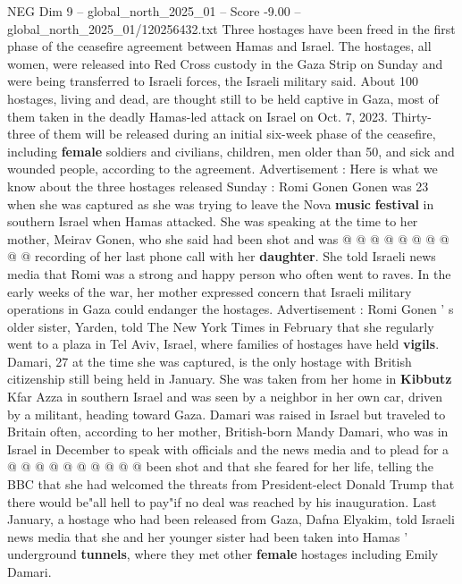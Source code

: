 \begin{textsample}{NEG Dim 9 – global\_north\_2025\_01 – Score -9.00 – global\_north\_2025\_01/120256432.txt}  \label{ex:f9_neg_026}
Three hostages have been freed in the first phase of the ceasefire agreement between Hamas and Israel.
The hostages, all women, were released into Red Cross custody in the Gaza Strip on Sunday and were being transferred to Israeli forces, the Israeli military said.
About 100 hostages, living and dead, are thought still to be held captive in Gaza, most of them taken in the deadly Hamas-led attack on Israel on Oct. 7, 2023.
Thirty-three of them will be released during an initial six-week phase of the ceasefire, including \textbf{female} soldiers and civilians, children, men older than 50, and sick and wounded people, according to the agreement.
Advertisement : Here is what we know about the three hostages released Sunday : Romi Gonen Gonen was 23 when she was captured as she was trying to leave the Nova \textbf{music} \textbf{festival} in southern Israel when Hamas attacked.
She was speaking at the time to her mother, Meirav Gonen, who she said had been shot and was @ @ @ @ @ @ @ @ @ @ recording of her last phone call with her \textbf{daughter}.
She told Israeli news media that Romi was a strong and happy person who often went to raves.
In the early weeks of the war, her mother expressed concern that Israeli military operations in Gaza could endanger the hostages.
Advertisement : Romi Gonen ' s older sister, Yarden, told The New York Times in February that she regularly went to a plaza in Tel Aviv, Israel, where families of hostages have held \textbf{vigils}.
Damari, 27 at the time she was captured, is the only hostage with British citizenship still being held in January.
She was taken from her home in \textbf{Kibbutz} Kfar Azza in southern Israel and was seen by a neighbor in her own car, driven by a militant, heading toward Gaza.
Damari was raised in Israel but traveled to Britain often, according to her mother, British-born Mandy Damari, who was in Israel in December to speak with officials and the news media and to plead for a @ @ @ @ @ @ @ @ @ @ been shot and that she feared for her life, telling the BBC that she had welcomed the threats from President-elect Donald Trump that there would be"all hell to pay"if no deal was reached by his inauguration.
Last January, a hostage who had been released from Gaza, Dafna Elyakim, told Israeli news media that she and her younger sister had been taken into Hamas ' underground \textbf{tunnels}, where they met other \textbf{female} hostages including Emily Damari.

\end{textsample}
